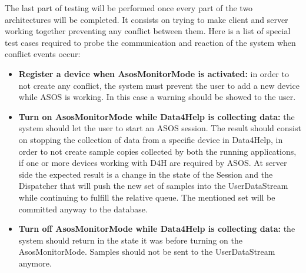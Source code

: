 {{}
The last part of testing will be performed once every part of the two architectures will be completed. It consists on trying to make client and server working together preventing any conflict between them. Here is a list of special test cases required to probe the communication and reaction of the system when conflict events occur:
\begin{itemize}
\item\textbf{Register a device when AsosMonitorMode is activated:} in order to not create any conflict, the system must prevent the user to add a new device while ASOS is working.%
In this case a warning should be showed to the user. 
\item\textbf{Turn on AsosMonitorMode while Data4Help is collecting data:} the system should let the user to start an ASOS session. The result should consist on stopping the collection of data from a specific device in Data4Help, in order to not create sample copies collected by both the running applications, if one or more devices working with D4H are required by ASOS. At server side the expected result is a change in the state of the Session and the Dispatcher that will push the new set of samples into the UserDataStream  while continuing to fulfill the relative queue. The mentioned set will be committed anyway to the database.
\item\textbf{Turn off AsosMonitorMode while Data4Help is collecting data:} the system should return in the state it was before turning on the AsosMonitorMode. Samples should not be sent to the UserDataStream anymore.
\end{itemize}
}










